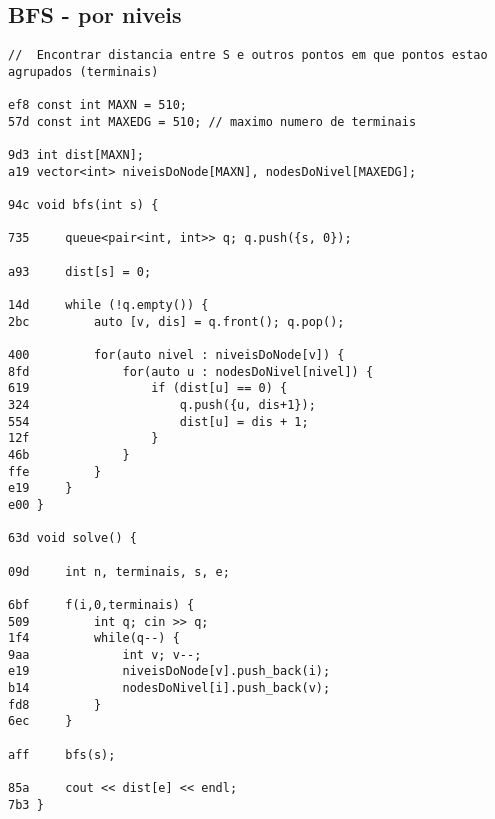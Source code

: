 \documentclass[11pt, a4paper, twoside]{article}
\begin{document}
\subsection{BFS - por niveis}
\begin{lstlisting}
//  Encontrar distancia entre S e outros pontos em que pontos estao agrupados (terminais)

ef8 const int MAXN = 510;
57d const int MAXEDG = 510; // maximo numero de terminais

9d3 int dist[MAXN];
a19 vector<int> niveisDoNode[MAXN], nodesDoNivel[MAXEDG];

94c void bfs(int s) {
    
735     queue<pair<int, int>> q; q.push({s, 0});
    
a93 	dist[s] = 0;
    
14d     while (!q.empty()) {
2bc         auto [v, dis] = q.front(); q.pop(); 
    
400         for(auto nivel : niveisDoNode[v]) {
8fd             for(auto u : nodesDoNivel[nivel]) {
619                 if (dist[u] == 0) {
324                     q.push({u, dis+1});
554                     dist[u] = dis + 1;
12f                 }
46b             }
ffe         }
e19     }
e00 }

63d void solve() {
    
09d 	int n, terminais, s, e;
    
6bf 	f(i,0,terminais) {
509 		int q; cin >> q;
1f4 		while(q--) {
9aa 			int v; v--;
e19 			niveisDoNode[v].push_back(i);
b14 			nodesDoNivel[i].push_back(v);
fd8 		}
6ec 	}
    
aff 	bfs(s);
    
85a 	cout << dist[e] << endl;
7b3 }
\end{lstlisting}
\end{document}
